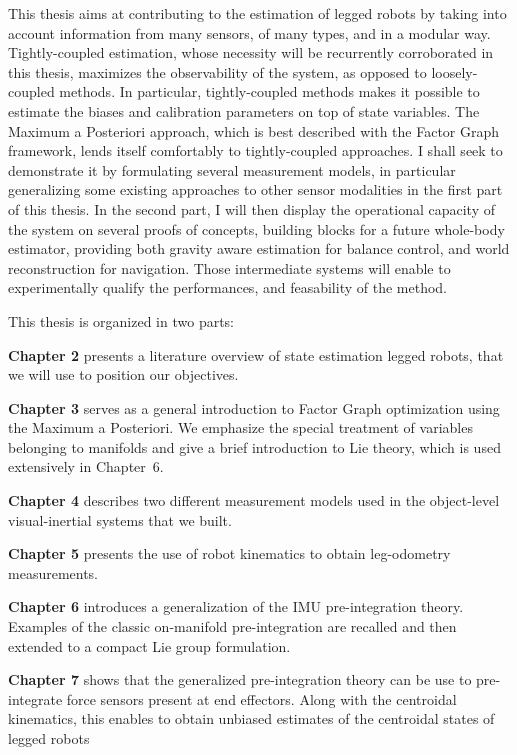 This thesis aims at contributing to the estimation of legged robots by taking into account information from
many sensors, of many types, and in a modular way. Tightly-coupled estimation, whose necessity will be recurrently corroborated in this thesis, maximizes the observability
of the system, as opposed to loosely-coupled methods. In particular, tightly-coupled methods makes it possible to estimate the biases and calibration parameters
on top of state variables. The Maximum a Posteriori approach, which is best described with the Factor Graph framework, lends itself comfortably 
to tightly-coupled approaches. I shall seek to demonstrate it by formulating several measurement models, in particular generalizing some existing approaches to other sensor modalities
in the first part of this thesis. In the second part,
I will then display the operational capacity of the system on several proofs of concepts, building blocks for a future whole-body estimator, providing both gravity aware
estimation for balance control, and world reconstruction for navigation. Those intermediate systems will enable to experimentally qualify the performances, 
and feasability of the method.

This thesis is organized in two parts:

\bigskip
\textbf{Chapter 2} presents a literature overview of state estimation legged robots, that we will use to position our objectives.

\bigskip
\textbf{Chapter 3} serves as a general introduction to Factor Graph optimization using the Maximum a Posteriori. We emphasize the special treatment of variables 
belonging to manifolds and give a brief introduction to Lie theory, which is used extensively in \mbox{Chapter 6}.

\bigskip
\textbf{Chapter 4} describes two different measurement models used in the object-level visual-inertial systems that we built. 

\bigskip
\textbf{Chapter 5} presents the use of robot kinematics to obtain leg-odometry measurements. 

\bigskip
\textbf{Chapter 6} introduces a generalization of the IMU pre-integration theory. Examples of the classic on-manifold pre-integration are recalled and 
then extended to a compact Lie group formulation. 

\bigskip
\textbf{Chapter 7} shows that the generalized pre-integration theory can be use to pre-integrate force sensors present at end effectors.
Along with the centroidal kinematics, this enables to obtain unbiased estimates of the centroidal states of legged robots

